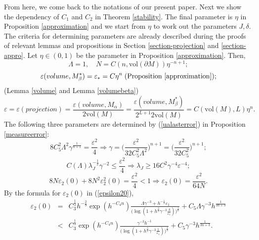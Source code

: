 \documentclass[11pt,letterpaper]{amsart}
\numberwithin{equation}{section}
\theoremstyle{definition}
\theoremstyle{plain}
\theoremstyle{definition}
\theoremstyle{plain}
\theoremstyle{definition}
\theoremstyle{plain}
\newcommand{\vol}{\textrm{vol}}
\begin{document}
\medskip
From here, we come back to the notations of our present paper. Next we show the dependency of $C_1$ and $C_2$ in Theorem \ref{stability}. The final parameter is $\eta$ in Proposition \ref{approximation} and we start from $\eta$ to work out the parameters $J,\delta$. The criteria for determining parameters are already described during the proofs of relevant lemmas and propositions in Section \ref{section-projection} and \ref{section-appro}. Let $\eta\in(0,1)$ be the parameter in Proposition \ref{approximation}. Then,
$$\Lambda=1,\quad N=C(n,\vol(\partial M))\eta^{-n+1};$$
$$\varepsilon(volume,M_{\beta}^{\ast})=\varepsilon_{\ast}=C\eta^n \; \textrm{(Proposition \ref{approximation})};$$
(Lemma \ref{volume} and Lemma \ref{volumebeta})
$$\varepsilon=\varepsilon(projection)=\frac{\varepsilon(volume,M_{\alpha})}{2\vol(M)}=\frac{\varepsilon(volume,M_{\beta}^{\ast})}{2^{L+1}2\vol(M)}=C(\vol(M),L)\eta^n.$$
The following three parameters are determined by (\ref{ualasterror}) in Proposition \ref{measureerror}:
\begin{equation}\label{Bgamma}
8C_5^2\Lambda^2\gamma^{\frac{1}{n+1}}=\frac{\varepsilon^2}{4} \Longrightarrow \gamma=\big(\frac{\varepsilon^2}{32C_5^2\Lambda^2}\big)^{n+1}=\big(\frac{\varepsilon^2}{32C_5^2}\big)^{n+1};
\end{equation}
$$C(\Lambda)\lambda_{J}^{-\frac{1}{2}}\gamma^{-2}\leqslant \frac{\varepsilon^2}{4} \Longrightarrow \lambda_{J}\geqslant 16C^2\gamma^{-4}\varepsilon^{-4};$$
$$8N\varepsilon_2(0)+8N^2\varepsilon_2^2(0)=\frac{\varepsilon^2}{4}<1 \Longrightarrow \varepsilon_2(0)=\frac{\varepsilon^2}{64N}.$$
By the formula for $\varepsilon_2(0)$ in (\ref{epsilon20}),
\begin{eqnarray}\label{newepsilon2}
\varepsilon_2(0)&=&C_3^{\frac{1}{3}}h^{-\frac{2}{9}}\exp(h^{-C_4 n}) \frac{\Lambda\gamma^{-3}+h^{-\frac{1}{2}}\varepsilon_1}{\big(\log (1+h^{\frac{3}{2}}\gamma^{-3}\frac{\Lambda}{\varepsilon_1})\big) ^{\frac{1}{6}}}+C_5\Lambda\gamma^{-3} h^{\frac{1}{3n+3}} \nonumber \\
&<& C_3^{\frac{1}{3}}\exp(h^{-C_4 n}) \frac{\gamma^{-3}h^{-1}}{\big(\log (1+h^{\frac{3}{2}}\gamma^{-3}\frac{1}{\varepsilon_1})\big) ^{\frac{1}{6}}}+C_5\gamma^{-3} h^{\frac{1}{3n+3}}.
\end{eqnarray}
\end{document}
